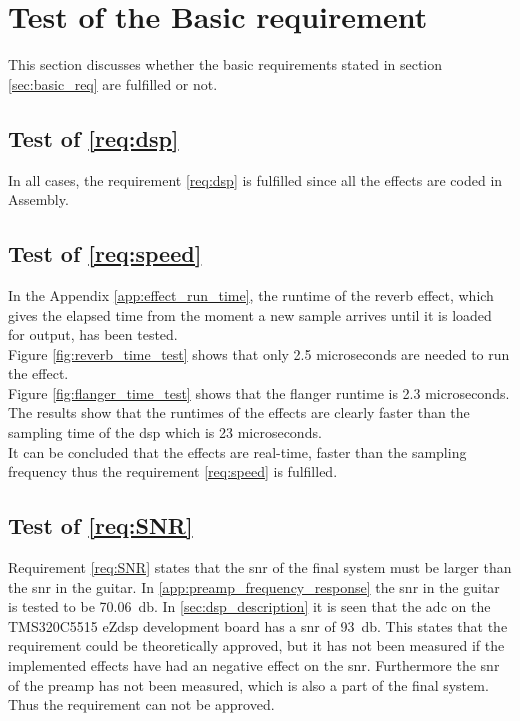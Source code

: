 \section{Test of the Basic requirement}
This section discusses whether the basic requirements stated in section \ref{sec:basic_req} are fulfilled or not. 

\subsection{Test of  \autoref{req:dsp}}
In all cases, the requirement \ref{req:dsp} is fulfilled since all the effects are coded in Assembly.


\subsection{Test of  \autoref{req:speed}}
In the Appendix \ref{app:effect_run_time}, the runtime of the reverb effect, which gives the elapsed time from the moment a new sample arrives until it is loaded for output, has been tested. \\
Figure \ref{fig:reverb_time_test} shows that only 2.5 microseconds are needed to run the effect. \\
Figure \ref{fig:flanger_time_test} shows that the flanger runtime is 2.3 microseconds. \\
The results show that the runtimes of the effects are clearly faster than the sampling time of the \gls{dsp} which is 23 microseconds. \\
It can be concluded that the effects are real-time, faster than the sampling frequency thus the requirement \ref{req:speed} is fulfilled. \\

\subsection{Test of \autoref{req:SNR}}
Requirement \autoref{req:SNR} states that the \gls{snr} of the final system must be larger than the \gls{snr} in the guitar. In \autoref{app:preamp_frequency_response} the \gls{snr} in the guitar is tested to be \SI{70.06}{\decibel}. In \autoref{sec:dsp_description} it is seen that the \gls{adc} on the TMS320C5515 eZdsp development board has a \gls{snr} of \SI{93}{\decibel}. This states that the requirement could be theoretically approved, but it has not been measured if the implemented effects have had an negative effect on the \gls{snr}. Furthermore the \gls{snr} of the \gls{preamp} has not been measured, which is also a part of the final system. Thus the requirement can not be approved. 

